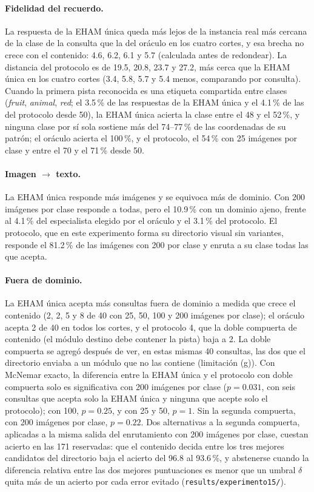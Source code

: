 \paragraph{Fidelidad del recuerdo.}
La respuesta de la EHAM única queda más lejos de la instancia real más cercana de la
clase de la consulta que la del oráculo en los cuatro cortes, y esa brecha no crece con
el contenido: 4.6, 6.2, 6.1 y 5.7 (calculada antes de redondear).
La distancia del protocolo es de 19.5, 20.8, 23.7 y 27.2, más cerca que la EHAM única
en los cuatro cortes (3.4, 5.8, 5.7 y 5.4 menos, comparando por consulta).
Cuando la primera pista reconocida es una etiqueta compartida entre clases
(\emph{fruit}, \emph{animal}, \emph{red}; el 3.5\,\% de las respuestas de la EHAM única y el 4.1\,\% de las del protocolo desde 50), la EHAM única
acierta la clase entre el 48 y el 52\,\%, y ninguna clase por sí sola sostiene más del
74--77\,\% de las coordenadas de su patrón; el oráculo acierta el 100\,\%, y el
protocolo, el 54\,\% con 25 imágenes por clase y entre el 70 y el 71\,\% desde 50.

\paragraph{Imagen $\to$ texto.}
La EHAM única responde más imágenes y se equivoca más de dominio.
Con 200 imágenes por clase responde a todas, pero el 10.9\,\% con un dominio ajeno,
frente al 4.1\,\% del especialista elegido por el oráculo y el 3.1\,\%
del protocolo.
El protocolo, que en este experimento forma su directorio visual sin variantes, responde
el 81.2\,\% de las imágenes con 200 por clase y enruta a su clase todas las que acepta.

\paragraph{Fuera de dominio.}
La EHAM única acepta más consultas fuera de dominio a medida que crece el contenido (2,
2, 5 y 8 de 40 con 25, 50, 100 y 200 imágenes por clase); el oráculo acepta 2 de 40 en
todos los cortes, y el protocolo 4, que la doble compuerta de contenido (el módulo
destino debe contener la pista) baja a 2.
La doble compuerta se agregó después de ver, en estas mismas 40 consultas, las dos que
el directorio enviaba a un módulo que no las contiene (limitación (g)).
Con McNemar exacto, la diferencia entre la EHAM única y el protocolo con doble compuerta
solo es significativa con 200 imágenes por clase ($p = 0.031$, con seis consultas que
acepta solo la EHAM única y ninguna que acepte solo el protocolo); con 100, $p = 0.25$,
y con 25 y 50, $p = 1$.
Sin la segunda compuerta, con 200 imágenes por clase, $p = 0.22$.
Dos alternativas a la segunda compuerta, aplicadas a la misma salida del enrutamiento
con 200 imágenes por clase, cuestan acierto en las 171 reservadas: que el contenido
decida entre los tres mejores candidatos del directorio baja el acierto del 96.8 al
93.6\,\%, y abstenerse cuando la diferencia relativa entre las dos mejores puntuaciones
es menor que un umbral $\delta$ quita más de un acierto por cada error evitado
(\texttt{results/experimento15/}).

